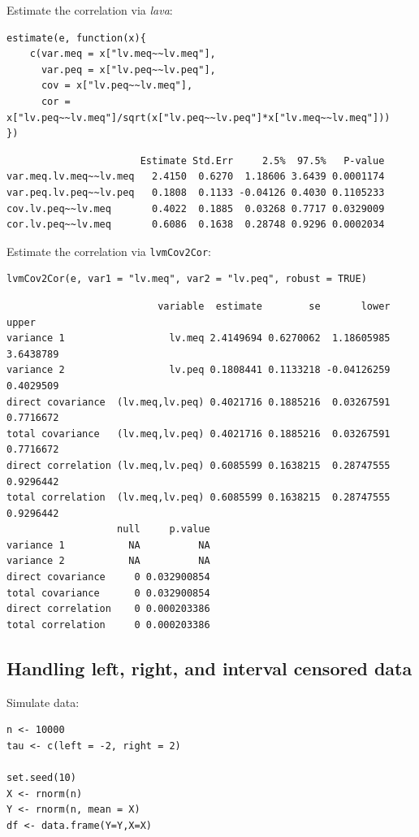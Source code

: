 \documentclass{article}
\begin{document}
Estimate the correlation via \emph{lava}:
\lstset{language=r,label= ,caption= ,captionpos=b,numbers=none}
\begin{lstlisting}
estimate(e, function(x){
    c(var.meq = x["lv.meq~~lv.meq"],
      var.peq = x["lv.peq~~lv.peq"],
      cov = x["lv.peq~~lv.meq"],
      cor = x["lv.peq~~lv.meq"]/sqrt(x["lv.peq~~lv.peq"]*x["lv.meq~~lv.meq"]))
})
\end{lstlisting}

\begin{verbatim}
                       Estimate Std.Err     2.5%  97.5%   P-value
var.meq.lv.meq~~lv.meq   2.4150  0.6270  1.18606 3.6439 0.0001174
var.peq.lv.peq~~lv.peq   0.1808  0.1133 -0.04126 0.4030 0.1105233
cov.lv.peq~~lv.meq       0.4022  0.1885  0.03268 0.7717 0.0329009
cor.lv.peq~~lv.meq       0.6086  0.1638  0.28748 0.9296 0.0002034
\end{verbatim}


Estimate the correlation via \texttt{lvmCov2Cor}:
\lstset{language=r,label= ,caption= ,captionpos=b,numbers=none}
\begin{lstlisting}
lvmCov2Cor(e, var1 = "lv.meq", var2 = "lv.peq", robust = TRUE)
\end{lstlisting}

\begin{verbatim}
                          variable  estimate        se       lower     upper
variance 1                  lv.meq 2.4149694 0.6270062  1.18605985 3.6438789
variance 2                  lv.peq 0.1808441 0.1133218 -0.04126259 0.4029509
direct covariance  (lv.meq,lv.peq) 0.4021716 0.1885216  0.03267591 0.7716672
total covariance   (lv.meq,lv.peq) 0.4021716 0.1885216  0.03267591 0.7716672
direct correlation (lv.meq,lv.peq) 0.6085599 0.1638215  0.28747555 0.9296442
total correlation  (lv.meq,lv.peq) 0.6085599 0.1638215  0.28747555 0.9296442
                   null     p.value
variance 1           NA          NA
variance 2           NA          NA
direct covariance     0 0.032900854
total covariance      0 0.032900854
direct correlation    0 0.000203386
total correlation     0 0.000203386
\end{verbatim}

\subsection{Handling left, right, and interval censored data}
\label{sec:org17abbb0}

Simulate data:
\lstset{language=r,label= ,caption= ,captionpos=b,numbers=none}
\begin{lstlisting}
n <- 10000
tau <- c(left = -2, right = 2)

set.seed(10)
X <- rnorm(n)
Y <- rnorm(n, mean = X)
df <- data.frame(Y=Y,X=X)
\end{lstlisting}
\end{document}
